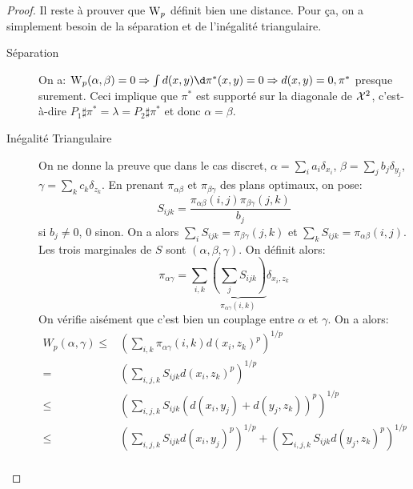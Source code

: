 \begin{proof}
	Il reste à prouver que $\operatorname{W}_{p}$ définit bien une distance.
	Pour ça, on a simplement besoin de la séparation et de l'inégalité triangulaire.
	\begin{description}
		\item[Séparation] On a: $\Wass_{p}(\alpha, \beta) = 0 \Rightarrow \int d (x, y)\d \pi^{*}(x, y) = 0 \Rightarrow d(x, y) = 0, \pi^{*}$ presque surement.
		      Ceci implique que $\pi^{*}$ est supporté sur la diagonale de $\mathcal{X}^{2}$, c'est-à-dire $P_{1}\sharp \pi^{*} = \lambda = P_2 \sharp \pi^{*}$ et donc $\alpha = \beta$.
		\item[Inégalité Triangulaire] On ne donne la preuve que dans le cas discret, $\alpha = \sum_{i} a_{i}\delta_{x_{i}}$, $\beta=\sum_{j} b_{j} \delta_{y_{j}}$, $\gamma = \sum_{k} c_{k}\delta_{z_{k}}$.
		      En prenant $\pi_{\alpha\beta}$ et $\pi_{\beta\gamma}$ des plans optimaux, on pose:
		      \begin{equation*}
			      S_{ijk} = \frac{\pi_{\alpha\beta}(i, j)\pi_{\beta\gamma}(j, k)}{b_{j}}
		      \end{equation*}
		      si $b_{j} \neq 0$, $0$ sinon.
		      On a alors $\sum_{i} S_{ijk} = \pi_{\beta\gamma}(j, k)$ et $\sum_{k} S_{ijk} = \pi_{\alpha\beta}(i, j)$.
		      Les trois marginales de $S$ sont $(\alpha, \beta, \gamma)$.
		      On définit alors:
		      \begin{equation*}
			      \pi_{\alpha\gamma} = \sum_{i, k} \underbrace{(\sum_{j} S_{ijk})}_{\pi_{\alpha\gamma}(i, k)}\delta_{x_{i}, z_{k}}
		      \end{equation*}
		      On vérifie aisément que c'est bien un couplage entre $\alpha$ et $\gamma$.
		      On a alors:
		      \begin{align*}
			      W_{p}(\alpha, \gamma) \leq & \left(\sum_{i, k}\pi_{\alpha\gamma}(i, k)d\left(x_{i}, z_{k}\right)^{p}\right)^{1/p}                                                                                  \\
			      =                          & \left(\sum_{i, j, k}S_{ijk}d\left(x_{i}, z_{k}\right)^{p}\right)^{1/p}                                                                                                \\
			      \leq                       & \left(\sum_{i, j, k}S_{ijk}\left(d\left(x_{i}, y_{j}\right) + d\left(y_{j}, z_{k}\right)\right)^{p}\right)^{1/p}                                                      \\
			      \leq                       & \left(\sum_{i,j,k}S_{ijk}d\left(x_{i}, y_{j}\right)^{p}\right)^{1/p} + \left(\sum_{i,j,k}S_{ijk}d\left(y_{j},z_{k}\right)^{p}\right)^{1/p}                            \\

\end{align*}
\end{description}
\end{proof}
